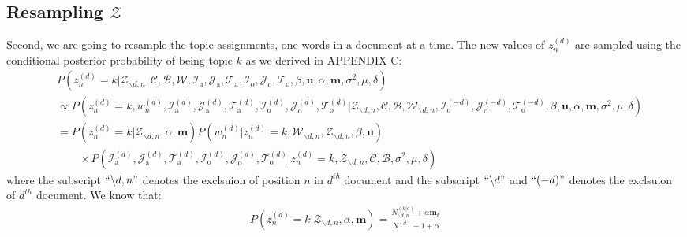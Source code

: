 \documentclass[a4paper]{article}
\begin{document}
 \subsection{Resampling $\mathcal{Z}$}  \label{subsec: Resampling Z}
Second, we are going to resample the topic assignments, one words in a document at a time.  The new values of $z^{(d)}_n$ are sampled using the conditional posterior probability of being topic $k$ as we derived in APPENDIX C:
 \begin{equation}
 \begin{aligned} & 
 P(z^{(d)}_n=k|\mathcal{Z}_{\backslash d, n},   \mathcal{C},   \mathcal{B},\mathcal{W}, \mathcal{I}_{\mbox{a}}, \mathcal{J}_{\mbox{a}}, \mathcal{T}_{\mbox{a}}, \mathcal{I}_{\mbox{o}}, \mathcal{J}_{\mbox{o}}, \mathcal{T}_{\mbox{o}}, \beta, \boldsymbol{u}, \alpha, \boldsymbol{m}, \sigma^2, \mu, \delta)\\
 & \propto P(z^{(d)}_n=k, w^{(d)}_n, \mathcal{I}^{(d)}_{\mbox{a}}, \mathcal{J}^{(d)}_{\mbox{a}}, \mathcal{T}^{(d)}_{\mbox{a}}, \mathcal{I}^{(d)}_{\mbox{o}}, \mathcal{J}^{(d)}_{\mbox{o}}, \mathcal{T}^{(d)}_{\mbox{o}}|\mathcal{Z}_{\backslash d, n}, \mathcal{C},   \mathcal{B},\mathcal{W}_{\backslash d, n}, \mathcal{I}^{(-d)}_{\mbox{o}}, \mathcal{J}^{(-d)}_{\mbox{o}}, \mathcal{T}^{(-d)}_{\mbox{o}}, \beta, \boldsymbol{u}, \alpha, \boldsymbol{m}, \sigma^2, \mu, \delta)\\
 &=P(z^{(d)}_n=k|\mathcal{Z}_{\backslash d, n}, \alpha, \boldsymbol{m})P(w^{(d)}_n|z^{(d)}_n=k, \mathcal{W}_{\backslash d, n}, \mathcal{Z}_{\backslash d, n}, \beta, \boldsymbol{u} )\\&\quad\quad \times P(\mathcal{I}^{(d)}_{\mbox{a}}, \mathcal{J}^{(d)}_{\mbox{a}}, \mathcal{T}^{(d)}_{\mbox{a}}, \mathcal{I}^{(d)}_{\mbox{o}}, \mathcal{J}^{(d)}_{\mbox{o}}, \mathcal{T}^{(d)}_{\mbox{o}}| z^{(d)}_n=k, \mathcal{Z}_{\backslash d, n}, \mathcal{C}, \mathcal{B}, \sigma^2, \mu, \delta)
 \end{aligned}
 \end{equation}
 where the subscript $``{\backslash d, n}"$ denotes the exclsuion of position $n$ in $d^{th}$ document and the subscript $``{\backslash d}"$ and $``{(-d)}"$ denotes the exclsuion of $d^{th}$ document. We know that:
 \begin{equation}
 \begin{aligned} 
 P(z^{(d)}_n=k|\mathcal{Z}_{\backslash d, n}, \alpha, \boldsymbol{m})=\frac{N^{(k|d)}_{\backslash d, n}+\alpha \boldsymbol{m}_k}{N^{(d)}-1+\alpha}
 \end{aligned}
 \end{equation}
\end{document}
